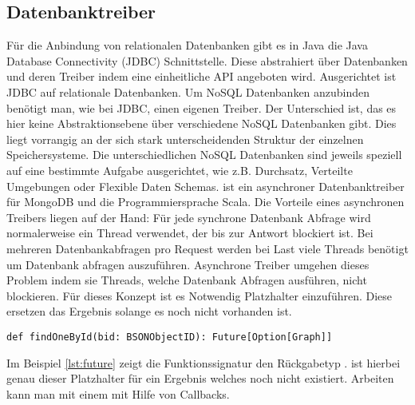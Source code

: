 \subsection{Datenbanktreiber}
Für die Anbindung von relationalen Datenbanken gibt es in Java die Java Database Connectivity (JDBC) Schnittstelle. Diese abstrahiert über Datenbanken und deren Treiber indem eine einheitliche API angeboten wird. Ausgerichtet ist JDBC auf relationale Datenbanken.
Um NoSQL Datenbanken anzubinden benötigt man, wie bei JDBC, einen eigenen Treiber. Der Unterschied ist, das es hier keine Abstraktionsebene über verschiedene NoSQL Datenbanken gibt. Dies liegt vorrangig an der sich stark unterscheidenden Struktur der einzelnen Speichersysteme. Die unterschiedlichen NoSQL Datenbanken sind jeweils speziell auf eine bestimmte Aufgabe ausgerichtet, wie z.B. Durchsatz, Verteilte Umgebungen oder Flexible Daten Schemas. 
 ist ein asynchroner Datenbanktreiber für MongoDB und die Programmiersprache Scala. Die Vorteile eines asynchronen Treibers liegen auf der Hand: Für jede synchrone Datenbank Abfrage wird normalerweise ein Thread verwendet, der bis zur Antwort blockiert ist. Bei mehreren Datenbankabfragen pro Request werden bei Last viele Threads benötigt um Datenbank abfragen auszuführen. Asynchrone Treiber umgehen dieses Problem indem sie Threads, welche Datenbank Abfragen ausführen, nicht blockieren. Für dieses Konzept ist es Notwendig Platzhalter einzuführen. Diese ersetzen das Ergebnis solange es noch nicht vorhanden ist.

\begin{lstlisting}[caption=Funktionssignatur für asynchronen Datenbankzugriff, label=lst:future]
def findOneById(bid: BSONObjectID): Future[Option[Graph]]
\end{lstlisting}
 
Im Beispiel \ref{lst:future} zeigt die Funktionssignatur den Rückgabetyp .  ist hierbei genau dieser Platzhalter für ein Ergebnis welches noch nicht existiert. Arbeiten kann man mit einem  mit Hilfe von Callbacks.
